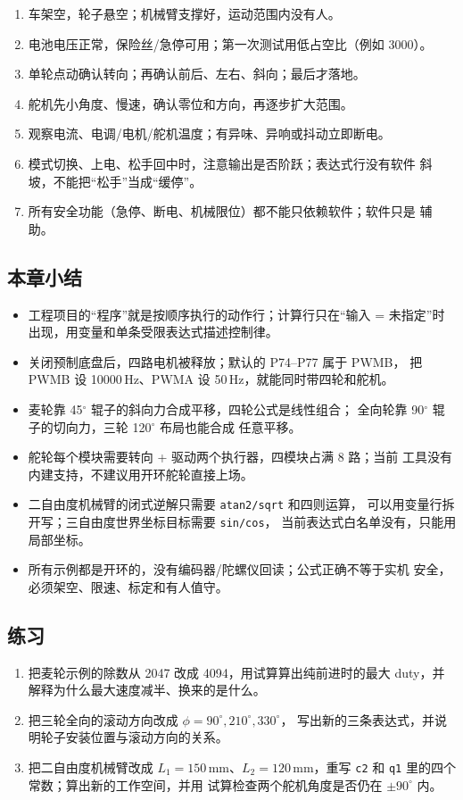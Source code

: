 \begin{enumerate}
  \item 车架空，轮子悬空；机械臂支撑好，运动范围内没有人。
  \item 电池电压正常，保险丝/急停可用；第一次测试用低占空比（例如 3000）。
  \item 单轮点动确认转向；再确认前后、左右、斜向；最后才落地。
  \item 舵机先小角度、慢速，确认零位和方向，再逐步扩大范围。
  \item 观察电流、电调/电机/舵机温度；有异味、异响或抖动立即断电。
  \item 模式切换、上电、松手回中时，注意输出是否阶跃；表达式行没有软件
        斜坡，不能把“松手”当成“缓停”。
  \item 所有安全功能（急停、断电、机械限位）都不能只依赖软件；软件只是
        辅助。
\end{enumerate}

\subsection{本章小结}

\begin{itemize}
  \item 工程项目的“程序”就是按顺序执行的动作行；计算行只在“输入 =
        未指定”时出现，用变量和单条受限表达式描述控制律。
  \item 关闭预制底盘后，四路电机被释放；默认的 P74--P77 属于 PWMB，
        把 PWMB 设 10000\,Hz、PWMA 设 50\,Hz，就能同时带四轮和舵机。
  \item 麦轮靠 45$^\circ$ 辊子的斜向力合成平移，四轮公式是线性组合；
        全向轮靠 90$^\circ$ 辊子的切向力，三轮 120$^\circ$ 布局也能合成
        任意平移。
  \item 舵轮每个模块需要转向 + 驱动两个执行器，四模块占满 8 路；当前
        工具没有内建支持，不建议用开环舵轮直接上场。
  \item 二自由度机械臂的闭式逆解只需要 \texttt{atan2/sqrt} 和四则运算，
        可以用变量行拆开写；三自由度世界坐标目标需要 \texttt{sin/cos}，
        当前表达式白名单没有，只能用局部坐标。
  \item 所有示例都是开环的，没有编码器/陀螺仪回读；公式正确不等于实机
        安全，必须架空、限速、标定和有人值守。
\end{itemize}

\subsection*{练习}

\begin{enumerate}
  \item 把麦轮示例的除数从 2047 改成 4094，用试算算出纯前进时的最大
        duty，并解释为什么最大速度减半、换来的是什么。
  \item 把三轮全向的滚动方向改成 $\phi=90^\circ,210^\circ,330^\circ$，
        写出新的三条表达式，并说明轮子安装位置与滚动方向的关系。
  \item 把二自由度机械臂改成 $L_1=150$\,mm、$L_2=120$\,mm，重写
        \texttt{c2} 和 \texttt{q1} 里的四个常数；算出新的工作空间，并用
        试算检查两个舵机角度是否仍在 $\pm90^\circ$ 内。
\end{enumerate}
